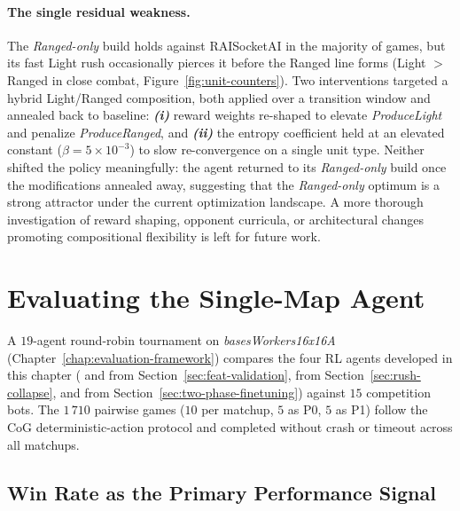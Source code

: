 \paragraph{The single residual weakness.}

The \emph{Ranged-only} build holds against RAISocketAI in the majority of games, but its fast Light rush occasionally pierces it before the Ranged line forms (Light $>$ Ranged in close combat, Figure~\ref{fig:unit-counters}). Two interventions targeted a hybrid Light/Ranged composition, both applied over a transition window and annealed back to baseline: \textbf{\emph{(i)}} reward weights re-shaped to elevate \emph{ProduceLight} and penalize \emph{ProduceRanged}, and \textbf{\emph{(ii)}} the entropy coefficient held at an elevated constant ($\beta = 5 \times 10^{-3}$) to slow re-convergence on a single unit type. Neither shifted the policy meaningfully: the agent returned to its \emph{Ranged-only} build once the modifications annealed away, suggesting that the \emph{Ranged-only} optimum is a strong attractor under the current optimization landscape. A more thorough investigation of reward shaping, opponent curricula, or architectural changes promoting compositional flexibility is left for future work.

\section{Evaluating the Single-Map Agent}
\label{sec:single-map-tournament}

A $19$-agent round-robin tournament on \emph{basesWorkers16x16A} (Chapter~\ref{chap:evaluation-framework}) compares the four RL agents developed in this chapter ( and  from Section~\ref{sec:feat-validation},  from Section~\ref{sec:rush-collapse}, and  from Section~\ref{sec:two-phase-finetuning}) against $15$ competition bots. The $1\,710$ pairwise games ($10$ per matchup, $5$ as P0, $5$ as P1) follow the CoG deterministic-action protocol and completed without crash or timeout across all matchups.

\subsection{Win Rate as the Primary Performance Signal}

